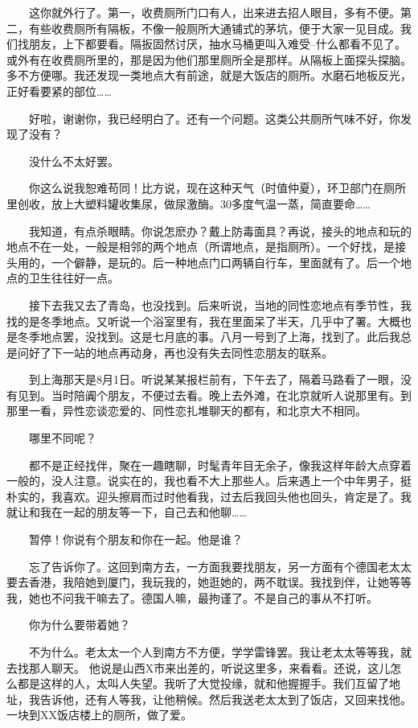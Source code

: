  　　这你就外行了。第一，收费厕所门口有人，出来进去招人眼目，多有不便。第二，有些收费厕所有隔板，不像一般厕所大通铺式的茅坑，便于大家一见目成。我们找朋友，上下都要看。隔扳固然讨厌，抽水马桶更叫入难受--什么都看不见了。或外有在收费厕所里的，那是因为他们那里厕所全是那样。从隔板上面探头探脑。多不方便哪。我还发现一类地点大有前途，就是大饭店的厕所。水磨石地板反光，正好看要紧的部位…… 
 
 　　好啦，谢谢你，我已经明白了。还有一个问题。这类公共厕所气味不好，你发现了没有？ 
 
 　　没什么不太好罢。 
 
 　　你这么说我恕难苟同！比方说，现在这种天气（时值仲夏），环卫部门在厕所里创收，放上大塑料罐收集尿，做尿激酶。30多度气温一蒸，简直要命…… 
 
 　　我知道，有点杀眼睛。你说怎麽办？戴上防毒面具？再说，接头的地点和玩的地点不在一处，一般是相邻的两个地点（所谓地点，是指厕所）。一个好找，是接头用的，一个僻静，是玩的。后一种地点门口两辆自行车，里面就有了。后一个地点的卫生往往好一点。 
 
 　　接下去我又去了青岛，也没找到。后来听说，当地的同性恋地点有季节性，我找的是冬季地点。又听说一个浴室里有，我在里面呆了半天，几乎中了署。大概也是冬季地点罢，没找到。这是七月底的事。八月一号到了上海，找到了。此后我总是问好了下一站的地点再动身，再也没有失去同性恋朋友的联系。 
 
 　　到上海那天是8月1日。听说某某报栏前有，下午去了，隔着马路看了一眼，没有见到。当时陪阗个朋友，不便过去看。晚上去外滩，在北京就听人说那里有。到那里一看，异性恋谈恋爱的、同性恋扎堆聊天的都有，和北京大不相同。 
 
 　　哪里不同呢？ 
 
 　　都不是正经找伴，聚在一趣瞎聊，时髦青年目无余子，像我这样年龄大点穿着一般的，没人注意。说实在的，我也看不大上那些人。后来遇上一个中年男子，挺朴实的，我喜欢。迎头擦肩而过时他看我，过去后我回头他也回头，肯定是了。我就让和我在一起的朋友等一下，自己去和他聊…… 
 
 　　暂停！你说有个朋友和你在一起。他是谁？ 
 
 　　忘了告诉你了。这回到南方去，一方面我要找朋友，另一方面有个德国老太太要去香港，我陪她到厦门，我玩我的，她逛她的，两不耽误。我找到伴，让她等等我，她也不问我干嘛去了。德国人嘛，最拘谨了。不是自己的事从不打听。 
 
 　　你为什么要带着她？ 
 
 　　不为什么。老太太一个人到南方不方便，学学雷锋罢。我让老太太等等我，就去找那人聊天。 他说是山西X市来出差的，听说这里多，来看看。还说，这儿怎么都是这样的人，太叫人失望。我听了大觉投缘，就和他握握手。我们互留了地址，我告诉他，还有人等我，让他稍候。然后我送老太太到了饭店，又回来找他。一块到XX饭店楼上的厕所，做了爱。 
 
